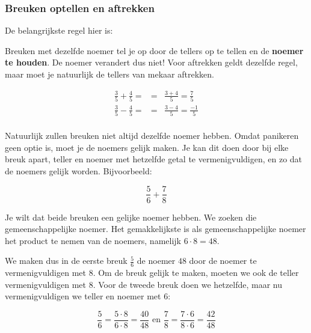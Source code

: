 \subsubsection{Breuken optellen en aftrekken}


De belangrijkste regel hier is:



Breuken met dezelfde noemer tel je op door de tellers op te tellen en de \textbf{noemer te houden}. De noemer verandert dus niet! Voor aftrekken geldt dezelfde regel, maar moet je natuurlijk de tellers van mekaar aftrekken.

\begin{eqnarray*}
\frac{3}{5}+\frac{4}{5}=&=& \frac{3+4}{5}=\frac{7}{5} \\
\frac{3}{5}-\frac{4}{5}=&=& \frac{3-4}{5}=\frac{-1}{5} \\
\end{eqnarray*}

Natuurlijk zullen breuken niet altijd dezelfde noemer hebben. Omdat panikeren geen optie is, moet je de noemers gelijk maken. Je kan dit doen door bij elke breuk apart, teller en noemer met hetzelfde getal te vermenigvuldigen, en zo dat de noemers gelijk worden. Bijvoorbeeld:

\begin{equation*}
\frac{5}{6}+\frac{7}{8}
\end{equation*}

Je wilt dat beide breuken een gelijke noemer hebben. We zoeken die gemeenschappelijke noemer. Het gemakkelijkste is als gemeenschappelijke noemer het product te nemen van de noemers, namelijk $6 \cdot 8=48$.

We maken dus in de eerste breuk $\frac{5}{6}$ de noemer $48$ door de noemer te vermenigvuldigen met $8$. Om de breuk gelijk te maken, moeten we ook de teller vermenigvuldigen met $8$. Voor de tweede breuk  doen we hetzelfde, maar nu vermenigvuldigen we teller en noemer met $6$:

\begin{equation*}
\frac{5}{6}=\frac{5 \cdot 8}{6 \cdot 8} =\frac{40}{48} \text{ en } \frac{7}{8}=\frac{7 \cdot 6}{8 \cdot 6} =\frac{42}{48}
\end{equation*}

